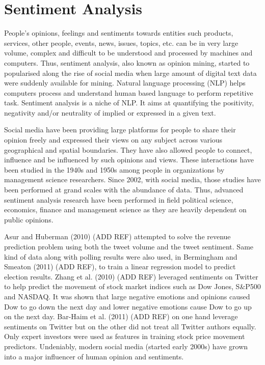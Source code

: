\chapter{Sentiment Analysis}
People's opinions, feelings and sentiments towards entities such products, services, other people, events, news, issues, topics, etc. can be in very large volume, complex and difficult to be understood and processed by machines and computers. Thus, sentiment analysis, also known as opinion mining, started to popularised along the rise of social media when large amount of digital text data were suddenly available for mining. Natural language processing (NLP) helps computers process and understand human based language to perform repetitive task. Sentiment analysis is a niche of NLP. It aims at quantifying the positivity, negativity and/or neutrality of implied or expressed in a given text.

Social media have been providing large platforms for people to share their opinion freely and expressed their views on any subject across various geographical and spatial  boundaries. They have also allowed people to connect, influence and be influenced by such opinions and views. These interactions have been studied in the 1940s and 1950s among people in organizations by management science researchers. Since 2002, with social media, those studies have been performed at grand scales with the abundance of data. Thus, advanced sentiment analysis research have been performed in field political science, economics, finance and management science as they are heavily dependent on public opinions. 

Asur and Huberman (2010) (ADD REF) attempted to solve the revenue prediction problem using both the tweet volume and the tweet sentiment. Same kind of data along with polling results were also used, in Bermingham and Smeaton (2011) (ADD REF), to train a linear regression model to predict election results. Zhang et al. (2010) (ADD REF) leveraged sentiments on Twitter to help predict the movement of stock market indices such as Dow Jones, S\&P500 and NASDAQ. It was shown that large negative emotions and opinions caused Dow to go down the next day and lower negative emotions cause Dow to go up on the next day. Bar-Haim et al. (2011) (ADD REF) on one hand leverage sentiments on Twitter but on the other did not treat all Twitter authors equally. Only expert investors were used as features in training stock price movement predictors. Undeniably, modern social media (started early 2000s) have grown into a major influencer of human opinion and sentiments.


